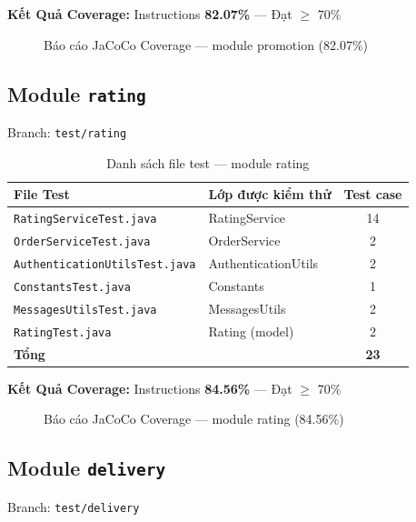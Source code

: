 \textbf{Kết Quả Coverage:} Instructions \textbf{82.07\%} --- Đạt $\geq$ 70\%

\begin{figure}[H]
\centering
{}
\caption{Báo cáo JaCoCo Coverage --- module promotion (82.07\%)}
\end{figure}

\subsection{Module \texttt{rating}}

Branch: \texttt{test/rating}

\begin{table}[H]
\centering
\caption{Danh sách file test --- module rating}
\begin{tabular}{|l|l|c|}
\hline
\textbf{File Test} & \textbf{Lớp được kiểm thử} & \textbf{Test case} \\
\hline
\texttt{RatingServiceTest.java} & RatingService & 14 \\
\hline
\texttt{OrderServiceTest.java} & OrderService & 2 \\
\hline
\texttt{AuthenticationUtilsTest.java} & AuthenticationUtils & 2 \\
\hline
\texttt{ConstantsTest.java} & Constants & 1 \\
\hline
\texttt{MessagesUtilsTest.java} & MessagesUtils & 2 \\
\hline
\texttt{RatingTest.java} & Rating (model) & 2 \\
\hline
\textbf{Tổng} & & \textbf{23} \\
\hline
\end{tabular}
\end{table}

\textbf{Kết Quả Coverage:} Instructions \textbf{84.56\%} --- Đạt $\geq$ 70\%

\begin{figure}[H]
\centering
{}
\caption{Báo cáo JaCoCo Coverage --- module rating (84.56\%)}
\end{figure}

\subsection{Module \texttt{delivery}}

Branch: \texttt{test/delivery}

